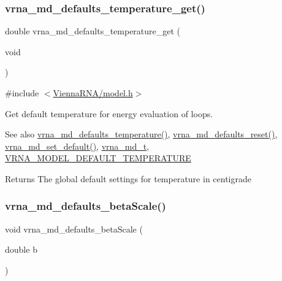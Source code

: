 \subsubsection{\texorpdfstring{vrna\_md\_defaults\_temperature\_get()}{vrna\_md\_defaults\_temperature\_get()}}
{\footnotesize\ttfamily double vrna\+\_\+md\+\_\+defaults\+\_\+temperature\+\_\+get (\begin{DoxyParamCaption}\item[{void}]{ }\end{DoxyParamCaption})}



{\ttfamily \#include $<$\mbox{\hyperlink{model_8h}{Vienna\+R\+N\+A/model.\+h}}$>$}



Get default temperature for energy evaluation of loops. 

\begin{DoxySeeAlso}{See also}
\mbox{\hyperlink{group__model__details_gaf9e527e9a2f7e6fd6e42bc6e602f5445}{vrna\+\_\+md\+\_\+defaults\+\_\+temperature()}}, \mbox{\hyperlink{group__model__details_ga70834424cf804d149937de89f80ceb45}{vrna\+\_\+md\+\_\+defaults\+\_\+reset()}}, \mbox{\hyperlink{group__model__details_ga8ac6ff84936282436f822644bf841f66}{vrna\+\_\+md\+\_\+set\+\_\+default()}}, \mbox{\hyperlink{group__model__details_ga1f8a10e12a0a1915f2a4eff0b28ea17c}{vrna\+\_\+md\+\_\+t}}, \mbox{\hyperlink{group__model__details_gaf47f9850b3b4763479f7a7e7a15648a2}{V\+R\+N\+A\+\_\+\+M\+O\+D\+E\+L\+\_\+\+D\+E\+F\+A\+U\+L\+T\+\_\+\+T\+E\+M\+P\+E\+R\+A\+T\+U\+RE}} 
\end{DoxySeeAlso}
\begin{DoxyReturn}{Returns}
The global default settings for temperature in centigrade 
\end{DoxyReturn}
\mbox{\label{group__model__details_gae984567db36c3f9b8731ecc917abf3a2}} 
\subsubsection{\texorpdfstring{vrna\_md\_defaults\_betaScale()}{vrna\_md\_defaults\_betaScale()}}
{\footnotesize\ttfamily void vrna\+\_\+md\+\_\+defaults\+\_\+beta\+Scale (\begin{DoxyParamCaption}\item[{double}]{b }\end{DoxyParamCaption})}



